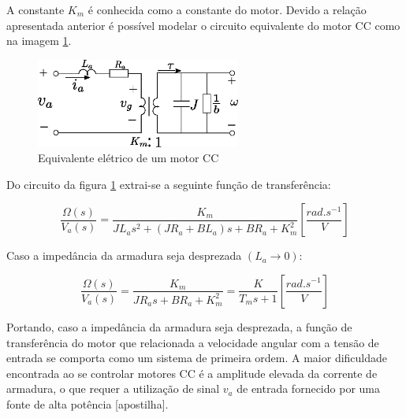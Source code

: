 A constante $K_{m}$ é conhecida como a constante do motor. Devido a relação apresentada anterior é possível modelar o circuito equivalente do motor CC como na imagem \ref{fig:eq_eletrico_motorcc}.
\begin{figure}[H]
    \centering
    \includegraphics[width=0.6\textwidth]{figuras/ilustracoes/circuito_equivalente_motor_cc.eps}
    \caption{Equivalente elétrico de um motor CC}
    \label{fig:eq_eletrico_motorcc}
\end{figure}

Do circuito da figura \ref{fig:eq_eletrico_motorcc} extrai-se a seguinte função de transferência:

\begin{equation*}
    \frac{\Omega(s)}{V_a(s)} = \frac{K_m}{JL_{a}s^2 + \left(JR_a + BL_a \right)s + BR_a + K_{m}^2} \left[\frac{ rad.s^{-1}}{V}  \right]
\end{equation*}

Caso a impedância da armadura seja desprezada $(L_a \xrightarrow{} 0)$:

\begin{equation}
    \frac{\Omega(s)}{V_{a}(s)} = \frac{K_m}{JR_{a}s + BR_{a} + K_{m}^2} = \frac{K}{T_{m}s + 1} \left[\frac{ rad.s^{-1}}{V}  \right]
    \label{eq:motor_transf_func}
\end{equation}

Portando, caso a impedância da armadura seja desprezada, a função de transferência do motor que relacionada a velocidade angular com a tensão de entrada se comporta como um sistema de primeira ordem. A maior dificuldade encontrada ao se controlar motores CC é a amplitude elevada da corrente de armadura, o que requer a utilização de sinal $v_a$ de entrada fornecido por uma fonte de alta potência [apostilha].